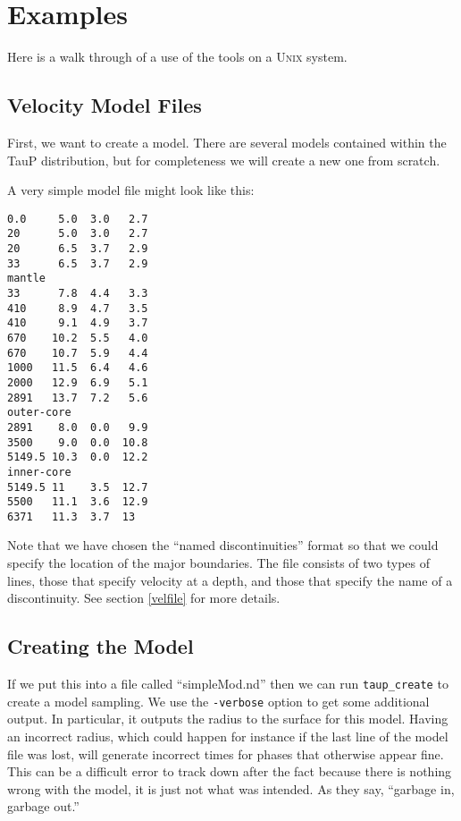 
\section{Examples} \label{exampleCreate}

Here is a walk through of a use of the tools on a \textsc{Unix} system. 

\subsection{Velocity Model Files} \label{exampleND} 
First, we want to create a model. There are several models contained within
the TauP distribution, but for completeness we will create a new one 
from scratch.

A very simple model file might look like this:

\begin{verbatim}
0.0     5.0  3.0   2.7
20      5.0  3.0   2.7
20      6.5  3.7   2.9
33      6.5  3.7   2.9
mantle
33      7.8  4.4   3.3
410     8.9  4.7   3.5
410     9.1  4.9   3.7
670    10.2  5.5   4.0
670    10.7  5.9   4.4
1000   11.5  6.4   4.6
2000   12.9  6.9   5.1
2891   13.7  7.2   5.6
outer-core
2891    8.0  0.0   9.9
3500    9.0  0.0  10.8
5149.5 10.3  0.0  12.2
inner-core
5149.5 11    3.5  12.7
5500   11.1  3.6  12.9
6371   11.3  3.7  13
\end{verbatim}

Note that we have chosen the ``named discontinuities'' format so
that we could specify the location of the major boundaries.
The file consists of two types of lines, those that specify velocity at a depth,
and those that specify the name of a discontinuity. See section \ref{velfile}
for more details.

\subsection{Creating the Model}

If we put this into a file called ``simpleMod.nd'' then we can run 
\texttt{taup\_create} to create a model sampling. We use the 
\texttt{-verbose} option to get some additional output. In particular,
it outputs the radius to the surface for this model. Having an incorrect
radius, which could happen for instance 
if the last line of the model file was lost,
will generate incorrect times for phases that otherwise appear fine.
This can be a difficult error to track down after the fact because
there is nothing wrong with the model, it is just not what was intended.
As they say, ``garbage in, garbage out.''

